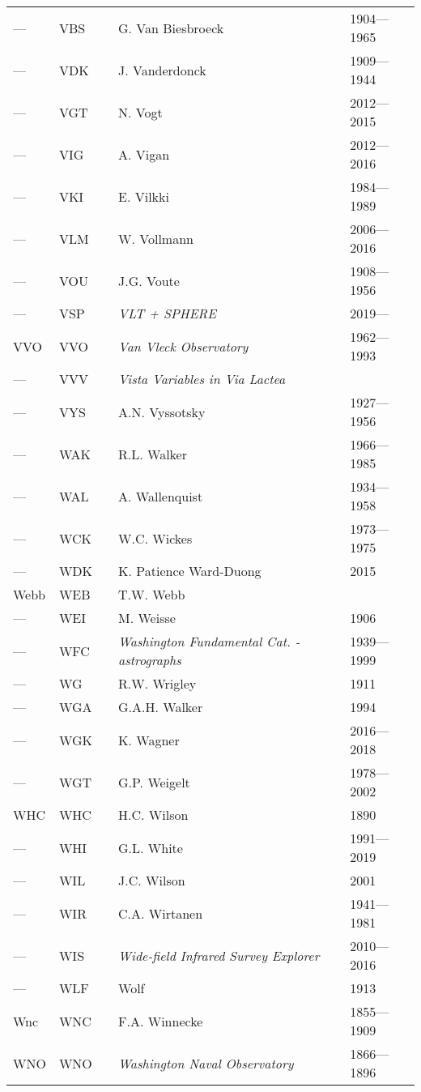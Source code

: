 \begin{longtable}{l|l|c|p{59mm}|l}
--- & VBS &   & G. Van Biesbroeck & 1904---1965 \\
--- & VDK &   & J. Vanderdonck & 1909---1944 \\
--- & VGT &   & N. Vogt & 2012---2015 \\
--- & VIG &   & A. Vigan & 2012---2016 \\
--- & VKI &   & E. Vilkki & 1984---1989 \\
--- & VLM &   & W. Vollmann & 2006---2016 \\
--- & VOU &   & J.G. Voute & 1908---1956 \\
--- & VSP &   & \emph{VLT + SPHERE} & 2019--- \\
VVO & VVO &   & \emph{Van Vleck Observatory} & 1962---1993 \\
--- & VVV &   & \emph{Vista Variables in Via Lactea} & \\
--- & VYS &   & A.N. Vyssotsky & 1927---1956 \\\midrule
--- & WAK &   & R.L. Walker & 1966---1985 \\
--- & WAL &   & A. Wallenquist & 1934---1958 \\
--- & WCK &   & W.C. Wickes & 1973---1975 \\
--- & WDK &   & K. Patience Ward-Duong & 2015 \\
Webb & WEB &   & T.W. Webb & \\
--- & WEI &   & M. Weisse & 1906 \\
--- & WFC &   & \emph{Washington Fundamental Cat. - astrographs} & 1939---1999 \\
--- & WG  &   & R.W. Wrigley & 1911 \\
--- & WGA &   & G.A.H. Walker & 1994 \\
--- & WGK &   & K. Wagner & 2016---2018 \\
--- & WGT &   & G.P. Weigelt & 1978---2002 \\
WHC & WHC &   & H.C. Wilson & 1890 \\
--- & WHI &   & G.L. White & 1991---2019 \\
--- & WIL &   & J.C. Wilson & 2001 \\
--- & WIR &   & C.A. Wirtanen & 1941---1981 \\
--- & WIS &   & \emph{Wide-field Infrared Survey Explorer} & 2010---2016 \\
--- & WLF &   & Wolf & 1913 \\
Wnc & WNC &   & F.A. Winnecke & 1855---1909 \\
WNO & WNO &   & \emph{Washington Naval Observatory} & 1866---1896 \\

\end{longtable}
